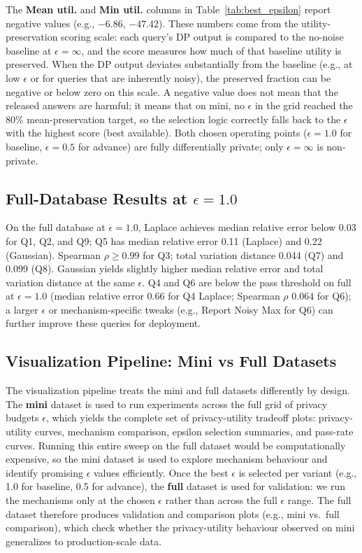 \documentclass[12pt,letterpaper]{article}
\begin{document}
The \textbf{Mean util.} and \textbf{Min util.} columns in Table~\ref{tab:best_epsilon} report negative values (e.g., $-6.86$, $-47.42$). These numbers come from the utility-preservation scoring scale: each query's DP output is compared to the no-noise baseline at $\epsilon = \infty$, and the score measures how much of that baseline utility is preserved. When the DP output deviates substantially from the baseline (e.g., at low $\epsilon$ or for queries that are inherently noisy), the preserved fraction can be negative or below zero on this scale. A negative value does not mean that the released answers are harmful; it means that on mini, no $\epsilon$ in the grid reached the 80\% mean-preservation target, so the selection logic correctly falls back to the $\epsilon$ with the highest score (best available). Both chosen operating points ($\epsilon = 1.0$ for baseline, $\epsilon = 0.5$ for advance) are fully differentially private; only $\epsilon = \infty$ is non-private.

\subsection{Full-Database Results at $\epsilon = 1.0$}
\label{sec:full_results}

On the full database at $\epsilon = 1.0$, Laplace achieves median relative error below 0.03 for Q1, Q2, and Q9; Q5 has median relative error 0.11 (Laplace) and 0.22 (Gaussian). Spearman $\rho \geq 0.99$ for Q3; total variation distance 0.044 (Q7) and 0.099 (Q8). Gaussian yields slightly higher median relative error and total variation distance at the same $\epsilon$. Q4 and Q6 are below the pass threshold on full at $\epsilon = 1.0$ (median relative error 0.66 for Q4 Laplace; Spearman $\rho$ 0.064 for Q6); a larger $\epsilon$ or mechanism-specific tweaks (e.g., Report Noisy Max for Q6) can further improve these queries for deployment.

\subsection{Visualization Pipeline: Mini vs Full Datasets}
\label{sec:viz_pipeline}

The visualization pipeline treats the mini and full datasets differently by design. The \textbf{mini} dataset is used to run experiments across the full grid of privacy budgets $\epsilon$, which yields the complete set of privacy-utility tradeoff plots: privacy-utility curves, mechanism comparison, epsilon selection summaries, and pass-rate curves. Running this entire sweep on the full dataset would be computationally expensive, so the mini dataset is used to explore mechanism behaviour and identify promising $\epsilon$ values efficiently. Once the best $\epsilon$ is selected per variant (e.g., 1.0 for baseline, 0.5 for advance), the \textbf{full} dataset is used for validation: we run the mechanisms only at the chosen $\epsilon$ rather than across the full $\epsilon$ range. The full dataset therefore produces validation and comparison plots (e.g., mini vs.\ full comparison), which check whether the privacy-utility behaviour observed on mini generalizes to production-scale data.
\end{document}
